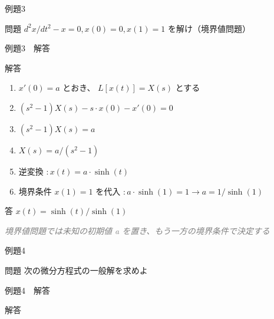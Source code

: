 \documentclass[aspectratio=43,professionalfonts,handout]{beamer}
\begin{document}
\begin{frame}{例題3}
  \begin{exampleblock}{問題}
    $d^{2}x/dt^{2} - x = 0, x(0) = 0, x(1) = 1$ を解け（境界値問題）\\[2pt]
  \end{exampleblock}
\end{frame}

\begin{frame}{例題3　解答}
  \begin{exampleblock}{解答}
  \begin{enumerate}[1.]
    \item[] $x'(0) = a$ とおき、 $L[x(t)] = X(s)$ とする
    \item[] $(s^{2}-1)X(s) - s\cdot x(0) - x'(0) = 0$
    \item[] $(s^{2}-1)X(s) = a$
    \item[] $X(s) = a/(s^{2}-1)$
    \item[] 逆変換 $: x(t) = a\cdot \sinh(t)$
    \item[] 境界条件 $x(1) = 1$ を代入 $: a\cdot \sinh(1) = 1 \to a = 1/\sinh(1)$
  \end{enumerate}
  \end{exampleblock}
  \begin{alertblock}{答}
    $x(t) = \sinh(t)/\sinh(1)$
  \end{alertblock}
  {\footnotesize \textcolor{gray}{\textit{境界値問題では未知の初期値 a を置き、もう一方の境界条件で決定する}}}
\end{frame}

\begin{frame}{例題4}
  \begin{exampleblock}{問題}
    次の微分方程式の一般解を求めよ\\[2pt]
  \end{exampleblock}
\end{frame}

\begin{frame}{例題4　解答}
  \begin{exampleblock}{解答}
  \end{exampleblock}
\end{frame}
\end{document}
